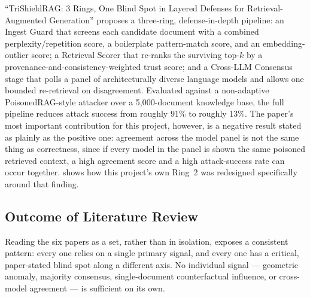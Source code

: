 ``TriShieldRAG: 3 Rings, One Blind Spot in Layered Defenses for
Retrieval-Augmented Generation'' proposes a three-ring, defense-in-depth
pipeline: an Ingest Guard that screens each candidate document with a
combined perplexity/repetition score, a boilerplate pattern-match score,
and an embedding-outlier score; a Retrieval Scorer that re-ranks the
surviving top-$k$ by a provenance-and-consistency-weighted trust score;
and a Cross-LLM Consensus stage that polls a panel of architecturally
diverse language models and allows one bounded re-retrieval on
disagreement. Evaluated against a non-adaptive PoisonedRAG-style attacker
over a 5,000-document knowledge base, the full pipeline reduces attack
success from roughly 91\% to roughly 13\%. The paper's most important
contribution for this project, however, is a negative result stated as
plainly as the positive one: agreement across the model panel is not the
same thing as correctness, since if every model in the panel is shown the
same poisoned retrieved context, a high agreement score and a high
attack-success rate can occur together.  shows how this
project's own Ring~2 was redesigned specifically around that finding.

\subsection{Outcome of Literature Review}

Reading the six papers as a set, rather than in isolation, exposes a
consistent pattern: every one relies on a single primary signal, and
every one has a critical, paper-stated blind spot along a different
axis. No individual signal --- geometric anomaly, majority consensus,
single-document counterfactual influence, or cross-model agreement --- is
sufficient on its own.

